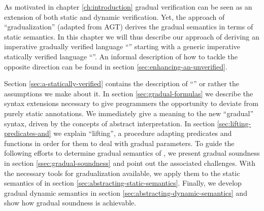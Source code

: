 As motivated in chapter \ref{ch:introduction} gradual verification can be seen as an extension of both static and dynamic verification.
Yet, the approach of “gradualization” (adapted from AGT) derives the gradual semantics in terms of static semantics.
In this chapter we will thus describe our approach of deriving an imperative gradually verified language “{\gvl}” starting with a generic imperative statically verified language “{\svl}”.
An informal description of how to tackle the opposite direction can be found in section \ref{sec:enhancing-an-unverified}.

Section \ref{sec:a-statically-verified} contains the description of “{\svl}” or rather the assumptions we make about it.
In section \ref{sec:gradual-formulas} we describe the syntax extensions necessary to give programmers the opportunity to deviate from purely static annotations.
We immediately give a meaning to the new “gradual” syntax, driven by the concepts of abstract interpretation.
In section \ref{sec:lifting-predicates-and} we explain “lifting”, a procedure adapting predicates and functions in order for them to deal with gradual parameters.
To guide the following efforts to determine gradual semantics of \gvl, we present gradual soundness in section \ref{ssec:gradual-soundness} and point out the associated challenges.
With the necessary tools for gradualization available, we apply them to the static semantics of \svl in section \ref{sec:abstracting-static-semantics}.
Finally, we develop gradual dynamic semantics in section \ref{sec:abstracting-dynamic-semantics} and show how gradual soundness is achievable.

